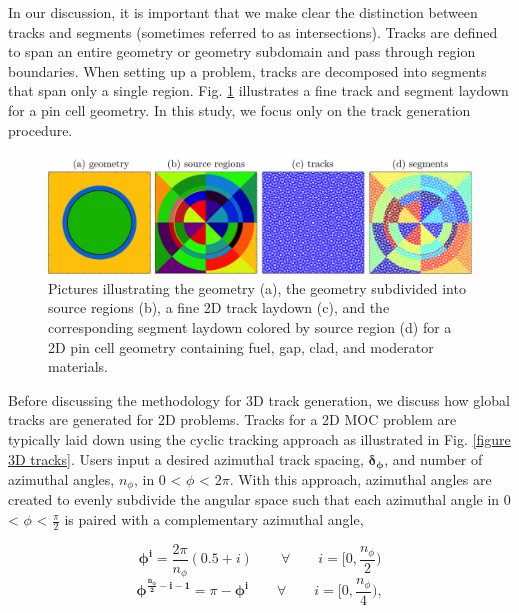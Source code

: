 In our discussion, it is important that we make clear the distinction between tracks and segments (sometimes referred to as intersections). Tracks are defined to span an entire geometry or geometry subdomain and pass through region boundaries. When setting up a problem, tracks are decomposed into segments that span only a single region. Fig. \ref{tracks-vs-segments} illustrates a fine track and segment laydown for a pin cell geometry. In this study, we focus only on the track generation procedure.
%
\begin{figure}[H]
	\vspace{-0.25in}
	\centering
	\includegraphics[width=6.5in]{figures/mc2015/tracks-vs-segments.png}
	\caption{Pictures illustrating the geometry (a), the geometry subdivided into source regions (b), a fine 2D track laydown (c), and the corresponding segment laydown colored by source region (d) for a 2D pin cell geometry containing fuel, gap, clad, and moderator materials.}
	\label{tracks-vs-segments}
	\vspace{-0.5in}
\end{figure}

Before discussing the methodology for 3D track generation, we discuss how global tracks are generated for 2D problems. Tracks for a 2D MOC problem are typically laid down using the cyclic tracking approach as illustrated in Fig. \ref{figure 3D tracks}. Users input a desired azimuthal track spacing, $\boldsymbol{\delta_\phi}$, and number of azimuthal angles, $n_{\phi}$, in 0 < $\phi$ < $2 \pi$. With this approach, azimuthal angles are created to evenly subdivide the angular space such that each azimuthal angle in 0 < $\phi$ < $\frac{\pi}{2}$ is paired with a complementary azimuthal angle,

\begin{equation}
\boldsymbol{\phi^i} = \frac{2 \pi}{n_\phi} (0.5 + i) \qquad \forall \qquad i = \Big[0,\frac{n_{\phi}}{2}\Big)
\end{equation}
%
\begin{equation}
\boldsymbol{\phi^{\frac{n_{\phi}}{2} - i - 1}} = \pi - \boldsymbol{\phi^i} \qquad \forall \qquad i= \Big[0,\frac{n_{\phi}}{4}\Big),
\end{equation} 

